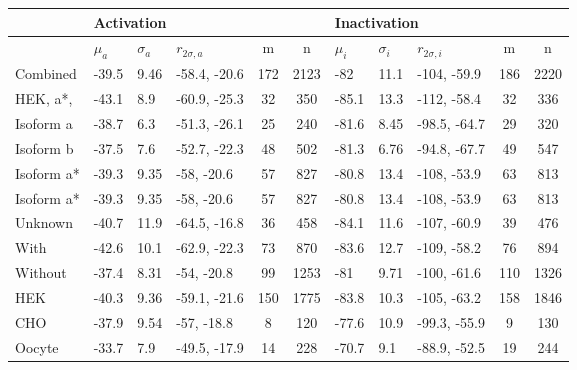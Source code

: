 \begin{tabular}{l | lll | cc | lll | cc}
\hline
\multicolumn{1}{l|}{} & \multicolumn{5}{l|}{Activation} & \multicolumn{5}{l}{Inactivation} \\ \hline
{} & $\mu_a$ & $\sigma_a$ & $r_{2\sigma,a}$ & m & n
   & $\mu_i$ & $\sigma_i$ & $r_{2\sigma,i}$ & m & n \\ \hline
Combined & -39.5 & 9.46 & -58.4, -20.6 & 172 & 2123 & -82 & 11.1 & -104, -59.9 & 186 & 2220 \\
HEK, a*, \bet1 & -43.1 & 8.9 & -60.9, -25.3 & 32 & 350 & -85.1 & 13.3 & -112, -58.4 & 32 & 336 \\
\hline
Isoform a & -38.7 & 6.3 & -51.3, -26.1 & 25 & 240 & -81.6 & 8.45 & -98.5, -64.7 & 29 & 320 \\
Isoform b & -37.5 & 7.6 & -52.7, -22.3 & 48 & 502 & -81.3 & 6.76 & -94.8, -67.7 & 49 & 547 \\
Isoform a* & -39.3 & 9.35 & -58, -20.6 & 57 & 827 & -80.8 & 13.4 & -108, -53.9 & 63 & 813 \\
Isoform a* & -39.3 & 9.35 & -58, -20.6 & 57 & 827 & -80.8 & 13.4 & -108, -53.9 & 63 & 813 \\
Unknown & -40.7 & 11.9 & -64.5, -16.8 & 36 & 458 & -84.1 & 11.6 & -107, -60.9 & 39 & 476 \\
\hline
With \bet1 & -42.6 & 10.1 & -62.9, -22.3 & 73 & 870 & -83.6 & 12.7 & -109, -58.2 & 76 & 894 \\
Without \bet1 & -37.4 & 8.31 & -54, -20.8 & 99 & 1253 & -81 & 9.71 & -100, -61.6 & 110 & 1326 \\
\hline
HEK & -40.3 & 9.36 & -59.1, -21.6 & 150 & 1775 & -83.8 & 10.3 & -105, -63.2 & 158 & 1846 \\
CHO & -37.9 & 9.54 & -57, -18.8 & 8 & 120 & -77.6 & 10.9 & -99.3, -55.9 & 9 & 130 \\
Oocyte & -33.7 & 7.9 & -49.5, -17.9 & 14 & 228 & -70.7 & 9.1 & -88.9, -52.5 & 19 & 244 \\
\hline
\end{tabular}
